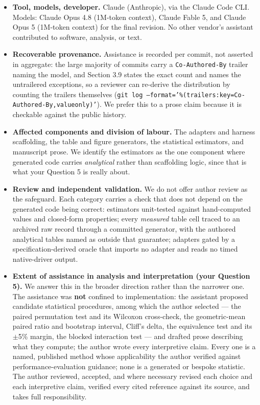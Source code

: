 \documentclass[11pt,a4paper]{article}
\begin{document}
\begin{itemize}
  \item \textbf{Tool, models, developer.} Claude (Anthropic), via the Claude Code CLI. Models: Claude Opus 4.8 (1M-token context), Claude Fable 5, and Claude Opus 5 (1M-token context) for the final revision. No other vendor's assistant contributed to software, analysis, or text.
  \item \textbf{Recoverable provenance.} Assistance is recorded per commit, not asserted in aggregate: the large majority of commits carry a \texttt{Co-Authored-By} trailer naming the model, and Section 3.9 states the exact count and names the untrailered exceptions, so a reviewer can re-derive the distribution by counting the trailers themselves (\texttt{git log --format='\%(trailers:key=Co-Authored-By,valueonly)'}). We prefer this to a prose claim because it is checkable against the public history.
  \item \textbf{Affected components and division of labour.} The adapters and harness scaffolding, the table and figure generators, the statistical estimators, and manuscript prose. We identify the estimators as the one component where generated code carries \emph{analytical} rather than scaffolding logic, since that is what your Question 5 is really about.
  \item \textbf{Review and independent validation.} We do not offer author review as the safeguard. Each category carries a check that does not depend on the generated code being correct: estimators unit-tested against hand-computed values and closed-form properties; every \emph{measured} table cell traced to an archived raw record through a committed generator, with the authored analytical tables named as outside that guarantee; adapters gated by a specification-derived oracle that imports no adapter and reads no timed native-driver output.
  \item \textbf{Extent of assistance in analysis and interpretation (your Question 5).} We answer this in the broader direction rather than the narrower one. The assistance was \textbf{not} confined to implementation: the assistant proposed candidate statistical procedures, among which the author selected --- the paired permutation test and its Wilcoxon cross-check, the geometric-mean paired ratio and bootstrap interval, Cliff's delta, the equivalence test and its $\pm$5\% margin, the blocked interaction test --- and drafted prose describing what they compute; the author wrote every interpretive claim. Every one is a named, published method whose applicability the author verified against performance-evaluation guidance; none is a generated or bespoke statistic. The author reviewed, accepted, and where necessary revised each choice and each interpretive claim, verified every cited reference against its source, and takes full responsibility.
\end{itemize}
\end{document}
